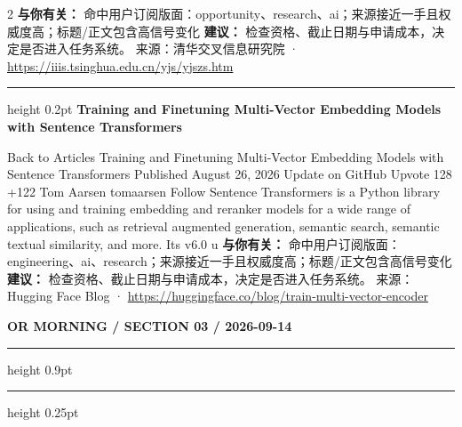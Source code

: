 \documentclass[10.5pt]{ctexart}
\begin{document}
\begin{multicols}{2}
\textbf{与你有关：} 命中用户订阅版面：opportunity、research、ai；来源接近一手且权威度高；标题/正文包含高信号变化
\textbf{建议：} 检查资格、截止日期与申请成本，决定是否进入任务系统。
{\footnotesize\color{ormuted} 来源：清华交叉信息研究院 · \url{https://iiis.tsinghua.edu.cn/yjs/yjszs.htm}}
\vspace{2mm}
\hrule height 0.2pt
\vspace{2mm}
{\large\bfseries Training and Finetuning Multi-Vector Embedding Models with Sentence Transformers}\par
Back to Articles Training and Finetuning Multi-Vector Embedding Models with Sentence Transformers Published August 26, 2026 Update on GitHub Upvote 128 +122 Tom Aarsen tomaarsen Follow Sentence Transformers is a Python library for using and training embedding and reranker models for a wide range of applications, such as retrieval augmented generation, semantic search, semantic textual similarity, and more. Its v6.0 u
\textbf{与你有关：} 命中用户订阅版面：engineering、ai、research；来源接近一手且权威度高；标题/正文包含高信号变化
\textbf{建议：} 检查资格、截止日期与申请成本，决定是否进入任务系统。
{\footnotesize\color{ormuted} 来源：Hugging Face Blog · \url{https://huggingface.co/blog/train-multi-vector-encoder}}
\end{multicols}
\newpage
{\small\bfseries OR MORNING / SECTION 03 / 2026-09-14}
\vspace{2mm}
\hrule height 0.9pt
\vspace{1.5mm}
\hrule height 0.25pt
\vspace{4mm}
\end{document}
